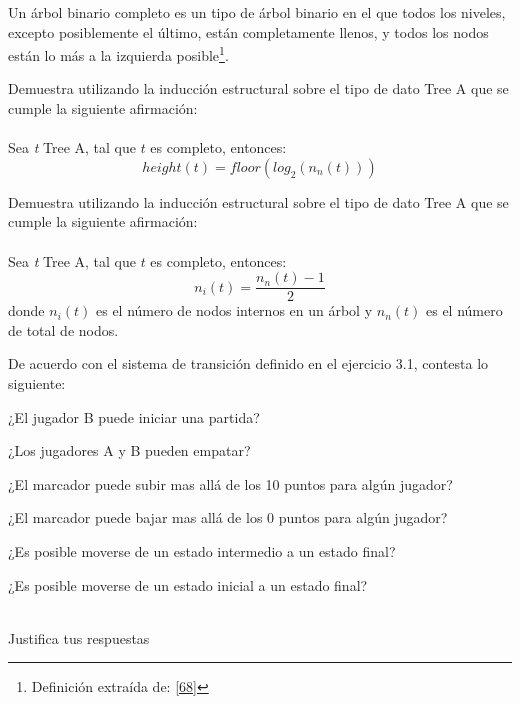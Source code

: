 	\begin{definition}
Un árbol binario completo es un tipo de árbol binario en el que todos los niveles, excepto posiblemente el último, están completamente llenos, y todos los nodos están lo más a la izquierda posible\footnote{Definición extraída de: \hyperlink{68}{[68]}}.
	\end{definition}

    \begin{exercise}
        Demuestra utilizando la inducción estructural sobre el tipo de dato Tree A que se cumple la siguiente afirmación:\\\\
        Sea \textit{t} Tree A, tal que $t$ es completo, entonces:
        \[ height(t) = floor(log_{2}(n_n(t)))\]
    \end{exercise}

    \begin{exercise}
Demuestra utilizando la inducción estructural sobre el tipo de dato Tree A que se cumple la siguiente afirmación:\\\\
        Sea \textit{t} Tree A, tal que $t$ es completo, entonces:
        \[   n_i(t) = \frac{n_n(t) - 1}{2} \] donde $n_i(t)$ es el número de nodos internos en un árbol y $n_n(t)$ es el número de total de nodos.
    \end{exercise}

    \begin{exercise}
        De acuerdo con el sistema de transición definido en el ejercicio 3.1, contesta lo siguiente: 
	\begin{item}
		\item ¿El jugador B puede iniciar una partida?
		\item ¿Los jugadores A y B pueden empatar?
		\item ¿El marcador puede subir mas allá de los 10 puntos para algún jugador?
		\item ¿El marcador puede bajar mas allá de los 0 puntos para algún jugador?
		\item ¿Es posible moverse de un estado intermedio a un estado final?
		\item ¿Es posible moverse de un estado inicial a un estado final?\\\\
 	\end{item}	
        Justifica tus respuestas
    \end{exercise}

